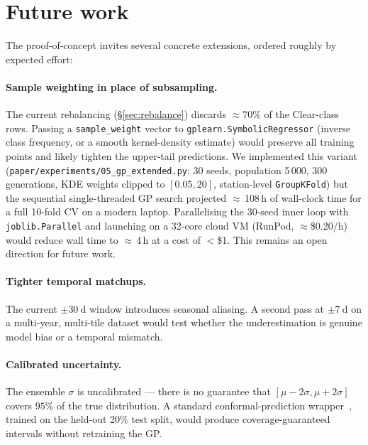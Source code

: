 \documentclass[11pt,a4paper]{article}
\begin{document}
\section{Future work}
\label{sec:future}

The proof-of-concept invites several concrete extensions, ordered roughly by expected effort:

\paragraph{Sample weighting in place of subsampling.}
The current rebalancing (\S\ref{sec:rebalance}) discards $\approx 70\%$ of the Clear-class rows. Passing a \texttt{sample\_weight} vector to \texttt{gplearn.SymbolicRegressor} (inverse class frequency, or a smooth kernel-density estimate) would preserve all training points and likely tighten the upper-tail predictions. We implemented this variant (\texttt{paper/experiments/05\_gp\_extended.py}: 30 seeds, population 5\,000, 300 generations, KDE weights clipped to $[0.05, 20]$, station-level \texttt{GroupKFold}) but the sequential single-threaded GP search projected $\approx$\,108\,h of wall-clock time for a full 10-fold CV on a modern laptop. Parallelising the 30-seed inner loop with \texttt{joblib.Parallel} and launching on a 32-core cloud VM (RunPod, $\approx$\$0.20/h) would reduce wall time to $\approx$\,4\,h at a cost of $<$\$1. This remains an open direction for future work.

\paragraph{Tighter temporal matchups.}
The current $\pm\SI{30}{\day}$ window introduces seasonal aliasing. A second pass at $\pm\SI{7}{\day}$ on a multi-year, multi-tile dataset would test whether the underestimation is genuine model bias or a temporal mismatch.

\paragraph{Calibrated uncertainty.}
The ensemble $\sigma$ is uncalibrated --- there is no guarantee that $[\mu - 2\sigma, \mu + 2\sigma]$ covers $95\%$ of the true distribution. A standard conformal-prediction wrapper~\cite{angelopoulos2023}, trained on the held-out 20\% test split, would produce coverage-guaranteed intervals without retraining the GP.
\end{document}
